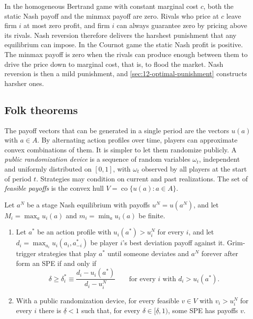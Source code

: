 In the homogeneous Bertrand game with constant marginal cost $c$, both the static Nash payoff and the minmax payoff
are zero. Rivals who price at $c$ leave firm $i$ at most zero profit, and firm $i$ can always guarantee zero by
pricing above its rivals. Nash reversion therefore delivers the harshest punishment that any equilibrium can impose.
In the Cournot game the static Nash profit is positive. The minmax payoff is zero when the rivals can produce enough
between them to drive the price down to marginal cost, that is, to flood the market. Nash reversion is then a mild punishment, and \cref{sec:12-optimal-punishment} constructs harsher ones.

\subsection{Folk theorems}\label{sec:12-folk}

The payoff vectors that can be generated in a single period are the vectors $u(a)$ with $a \in A$. By alternating
action profiles over time, players can approximate convex combinations of them. It is simpler to let them randomize
publicly. A \emph{public randomization device} is a sequence of random variables $\omega_t$, independent and
uniformly distributed on $[0, 1]$, with $\omega_t$ observed by all players at the start of period $t$. Strategies may
condition on current and past realizations. The set of \emph{feasible payoffs} is the convex hull
$V = \operatorname{co}\{u(a) : a \in A\}$.

\begin{theorem}\label{thm:12-folk-nash}
Let $a^N$ be a stage Nash equilibrium with payoffs $u^N = u(a^N)$, and let $M_i = \max_a u_i(a)$ and
$m_i = \min_a u_i(a)$ be finite.
\begin{enumerate}[label=(\roman*)]
\item Let $a^*$ be an action profile with $u_i(a^*) > u_i^N$ for every $i$, and let
  $d_i = \max_{a_i}u_i(a_i, a_{-i}^*)$ be player $i$'s best deviation payoff against it. Grim-trigger strategies
  that play $a^*$ until someone deviates and $a^N$ forever after form an SPE if and only if
  \begin{equation}\label{eq:12-folk-threshold}
  \delta \ge \delta_i^* \equiv \frac{d_i - u_i(a^*)}{d_i - u_i^N}
  \qquad \text{for every } i \text{ with } d_i > u_i(a^*) .
  \end{equation}
\item With a public randomization device, for every feasible $v \in V$ with $v_i > u_i^N$ for every $i$ there is
  $\underline\delta < 1$ such that, for every $\delta \in [\underline\delta, 1)$, some SPE has payoffs $v$.
\end{enumerate}
\end{theorem}

